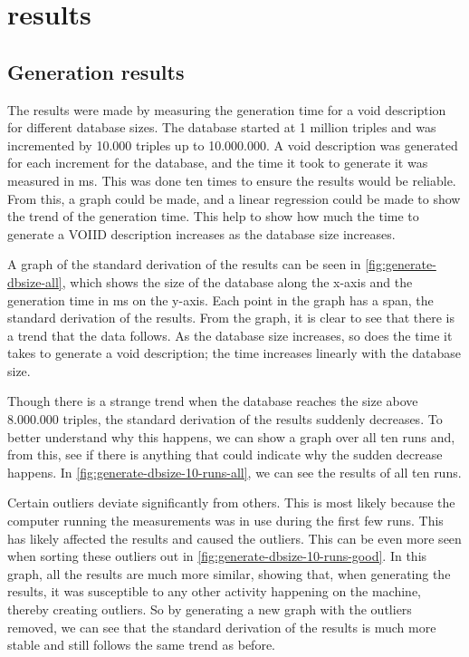 \section{results}\label{sec:results}
\subsection{Generation results}\label{subsec:generation-results}
The results were made by measuring the generation time for a \gls{void} description for different database sizes. The database started at 1 million triples and was incremented by 10.000 triples up to 10.000.000. A \gls{void} description was generated for each increment for the database, and the time it took to generate it was measured in ms. This was done ten times to ensure the results would be reliable. From this, a graph could be made, and a linear regression could be made to show the trend of the generation time. This help to show how much the time to generate a VOIID description increases as the database size increases.

A graph of the standard derivation of the results can be seen in \autoref{fig:generate-dbsize-all}, which shows the size of the database along the x-axis and the generation time in ms on the y-axis. Each point in the graph has a span, the standard derivation of the results. From the graph, it is clear to see that there is a trend that the data follows. As the database size increases, so does the time it takes to generate a \gls{void} description; the time increases linearly with the database size.

Though there is a strange trend when the database reaches the size above 8.000.000 triples, the standard derivation of the results suddenly decreases. To better understand why this happens, we can show a graph over all ten runs and, from this, see if there is anything that could indicate why the sudden decrease happens. In \autoref{fig:generate-dbsize-10-runs-all}, we can see the results of all ten runs.

Certain outliers deviate significantly from others. This is most likely because the computer running the measurements was in use during the first few runs. This has likely affected the results and caused the outliers. This can be even more seen when sorting these outliers out in \autoref{fig:generate-dbsize-10-runs-good}. In this graph, all the results are much more similar, showing that, when generating the results, it was susceptible to any other activity happening on the machine, thereby creating outliers. So by generating a new graph with the outliers removed, we can see that the standard derivation of the results is much more stable and still follows the same trend as before.

